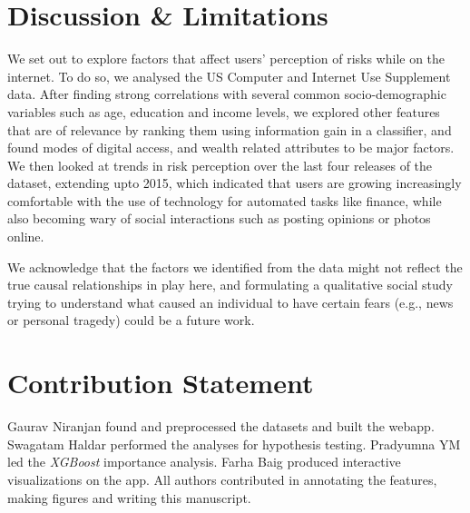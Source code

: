 \documentclass{article}
\theoremstyle{plain}
\theoremstyle{definition}
\theoremstyle{remark}
\begin{document}



\section{Discussion \& Limitations}\label{sec:conclusion}

We set out to explore factors that affect users' perception of risks while on the internet. To do so, we analysed the US Computer and Internet Use Supplement data. After finding strong correlations with several common socio-demographic variables such as age, education and income levels, we explored other features that are of relevance by ranking them using information gain in a classifier, and found modes of digital access, and wealth related attributes to be major factors. We then looked at trends in risk perception over the last four releases of the dataset, extending upto 2015, which indicated that users are growing increasingly comfortable with the use of technology for automated tasks like finance, while also becoming wary of social interactions such as posting opinions or photos online. 

We acknowledge that the factors we identified from the data might not reflect the true causal relationships in play here, and formulating a qualitative social study trying to understand what caused an individual to have certain fears (e.g., news or personal tragedy) could be a future work.


\section*{Contribution Statement}

Gaurav Niranjan found and preprocessed the datasets and built the webapp. Swagatam Haldar performed the analyses for hypothesis testing. Pradyumna YM led the \emph{XGBoost} importance analysis. Farha Baig produced interactive visualizations on the app. All authors contributed  in annotating the features, making figures and writing this manuscript.
\end{document}
